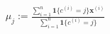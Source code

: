 \documentclass[preview]{standalone}
\begin{document}
\begin{align*}
\mu_{j}:=\frac{\sum_{i=1}^{n}\mathbf{1}\{c^{(i)}=j\}\mathbf{x}^{(i)}}{\sum_{i=1}^{n}\mathbf{1}\{c^{(i)}=j\}}
\end{align*}
\end{document}
